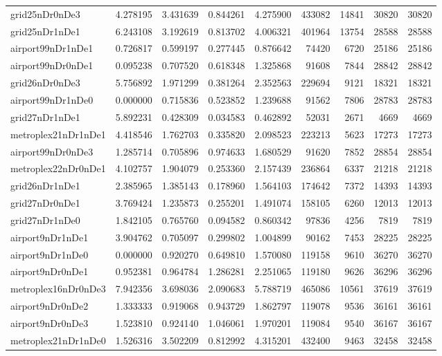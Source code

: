 \begin{longtable}{|l|r|r|r|r|r|r|r|r|}
grid25nDr0nDe3 & 4.278195 & 3.431639 & 0.844261 & 4.275900 & 433082 & 14841 & 30820 & 30820 \\
grid25nDr1nDe1 & 6.243108 & 3.192619 & 0.813702 & 4.006321 & 401964 & 13754 & 28588 & 28588 \\
airport99nDr1nDe1 & 0.726817 & 0.599197 & 0.277445 & 0.876642 & 74420 & 6720 & 25186 & 25186 \\
airport99nDr0nDe1 & 0.095238 & 0.707520 & 0.618348 & 1.325868 & 91608 & 7844 & 28842 & 28842 \\
grid26nDr0nDe3 & 5.756892 & 1.971299 & 0.381264 & 2.352563 & 229694 & 9121 & 18321 & 18321 \\
airport99nDr1nDe0 & 0.000000 & 0.715836 & 0.523852 & 1.239688 & 91562 & 7806 & 28783 & 28783 \\
grid27nDr1nDe1 & 5.892231 & 0.428309 & 0.034583 & 0.462892 & 52031 & 2671 & 4669 & 4669 \\
metroplex21nDr1nDe1 & 4.418546 & 1.762703 & 0.335820 & 2.098523 & 223213 & 5623 & 17273 & 17273 \\
airport99nDr0nDe3 & 1.285714 & 0.705896 & 0.974633 & 1.680529 & 91620 & 7852 & 28854 & 28854 \\
metroplex22nDr0nDe1 & 4.102757 & 1.904079 & 0.253360 & 2.157439 & 236864 & 6337 & 21218 & 21218 \\
grid26nDr1nDe1 & 2.385965 & 1.385143 & 0.178960 & 1.564103 & 174642 & 7372 & 14393 & 14393 \\
grid27nDr0nDe1 & 3.769424 & 1.235873 & 0.255201 & 1.491074 & 158105 & 6260 & 12013 & 12013 \\
grid27nDr1nDe0 & 1.842105 & 0.765760 & 0.094582 & 0.860342 & 97836 & 4256 & 7819 & 7819 \\
airport9nDr1nDe1 & 3.904762 & 0.705097 & 0.299802 & 1.004899 & 90162 & 7453 & 28225 & 28225 \\
airport9nDr1nDe0 & 0.000000 & 0.920270 & 0.649810 & 1.570080 & 119158 & 9610 & 36270 & 36270 \\
airport9nDr0nDe1 & 0.952381 & 0.964784 & 1.286281 & 2.251065 & 119180 & 9626 & 36296 & 36296 \\
metroplex16nDr0nDe3 & 7.942356 & 3.698036 & 2.090683 & 5.788719 & 465086 & 10561 & 37619 & 37619 \\
airport9nDr0nDe2 & 1.333333 & 0.919068 & 0.943729 & 1.862797 & 119078 & 9536 & 36161 & 36161 \\
airport9nDr0nDe3 & 1.523810 & 0.924140 & 1.046061 & 1.970201 & 119084 & 9540 & 36167 & 36167 \\
metroplex21nDr1nDe0 & 1.526316 & 3.502209 & 0.812992 & 4.315201 & 432400 & 9463 & 32458 & 32458 \\

\end{longtable}
